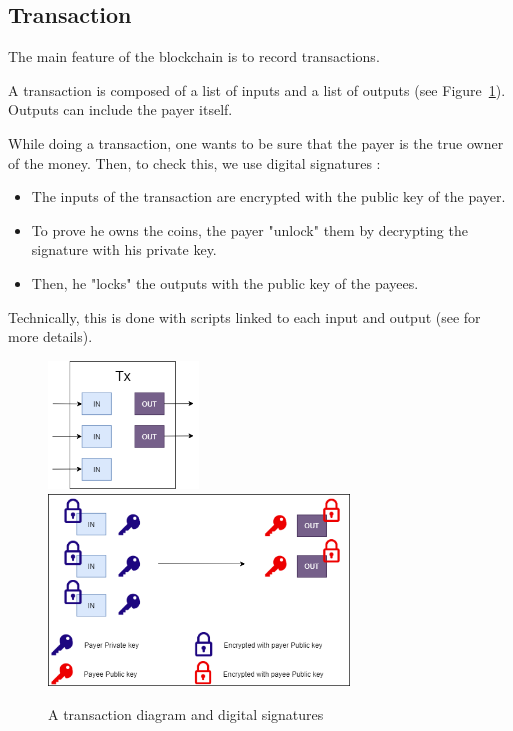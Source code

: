   \subsection{Transaction}

The main feature of the blockchain is to record transactions.

A transaction is composed of a list of inputs and a list of outputs (see Figure~\ref{transaction}). Outputs can include the payer itself. \newline

While doing a transaction, one wants to be sure that the payer is the true owner of the money. Then, to check this,  we use digital signatures :

\begin{itemize}
  \item The inputs of the transaction are encrypted with the public key of the payer.
  \item To prove he owns the coins, the payer "unlock" them by decrypting the signature with his private key.
  \item Then, he "locks" the outputs with the public key of the payees.
\end{itemize}

Technically, this is done with scripts linked to each input and output (see \cite{broken_crypto_primitives} for more details).


\begin{figure}[ht]
\centering
\includegraphics[width=4cm]{Figures/Transaction}
\hspace{1cm}
\includegraphics[width=8cm]{Figures/Transaction2}
\caption{A transaction diagram and digital signatures}
\label{transaction}
\end{figure}
\medskip

